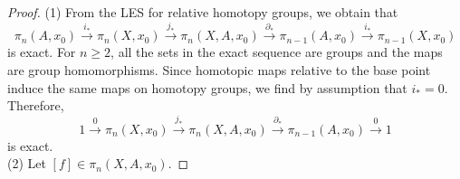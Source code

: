 \documentclass[reqno]{amsart}
\theoremstyle{definition}
\theoremstyle{remark}
\begin{document}
    \begin{proof}
        (1) From the LES for relative homotopy groups, we obtain that
        \[
        \pi_n (A, x_0) \stackrel{i_*}{\to}  \pi_n(X,x_0)
        \stackrel{j_*}{\to} \pi_n \left( X, A, x_0 \right) 
        \stackrel{\partial_*}{\to} 
        \pi_{n-1}(A,x_0) \stackrel{i_*}{\to} 
        \pi_{n-1} \left( X, x_0 \right) 
        \] 
        is exact.
        For $n\ge 2$, all the sets in the exact sequence are
        groups and the maps are group homomorphisms.
        Since homotopic maps relative to the base point induce
        the same maps on homotopy groups, we find by assumption
        that $i_* = 0$. Therefore,
        \[
        1 \stackrel{0}{\to}   \pi_n(X,x_0)
        \stackrel{j_*}{\to} \pi_n \left( X, A, x_0 \right) 
        \stackrel{\partial_*}{\to} 
        \pi_{n-1}(A,x_0) \stackrel{0}{\to} 
        1
        \] 
        is exact.\\
        \linebreak
        (2) Let
        $\left[ f \right] \in \pi_n \left( X, A,x_0 \right) $.

    \end{proof}



\end{document}
